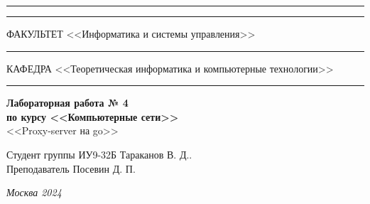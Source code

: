 \documentclass[a4paper, 14pt]{extarticle}
\begin{document}
\begin{titlepage}
		\vspace{-25pt}
		\hspace{-35pt}\rule{\textwidth}{2.3pt}
		
		\vspace*{-20.3pt}
		\hspace{-35pt}\rule{\textwidth}{0.4pt}
		
		\vspace{1.5ex}
		\hspace{-35pt} \noindent \small ФАКУЛЬТЕТ\hspace{80pt} <<Информатика и системы управления>>
		
		\vspace*{-16pt}
		\hspace{47pt}\rule{0.83\textwidth}{0.4pt}
		
		\vspace{0.5ex}
		\hspace{-35pt} \noindent \small КАФЕДРА\hspace{50pt} <<Теоретическая информатика и компьютерные технологии>>
		
		\vspace*{-16pt}
		\hspace{30pt}\rule{0.866\textwidth}{0.4pt}
		
		\vspace{11em}
		
		\begin{center}
			\Large {\bf Лабораторная работа № 4} \\
			\large {\bf по курсу <<Компьютерные сети>>} \\
			\large <<Proxy-server на go>>
		\end{center}\normalsize
		
		\vspace{8em}
		
		
		\begin{flushright}
			{Студент группы ИУ9-32Б  Тараканов В. Д.. \hspace*{15pt}\\
				\vspace{2ex}
				Преподаватель Посевин Д. П.\hspace*{15pt}}
		\end{flushright}
		
		\bigskip
		
		\vfill
		
		
		\begin{center}
			\textsl{Москва 2024}
		\end{center}
	\end{titlepage}
	
\end{document}
